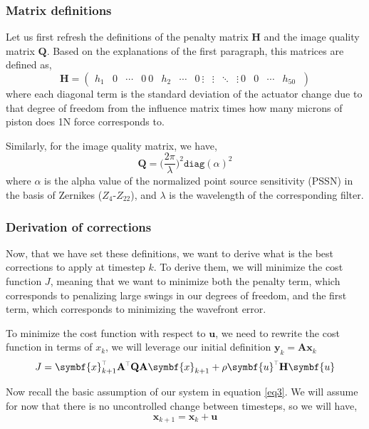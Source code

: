 \documentclass[SE,authoryear,toc]{lsstdoc}
\renewcommand{\v}[1]{\mathbf{#1}}
\newcommand{\tr}{\scalebox{0.6}{$\top$}}
\begin{document}
\subsubsection*{Matrix definitions}
Let us first refresh the definitions of the penalty matrix $\v{H}$ and the image quality matrix $\v{Q}$. Based on the explanations of the first paragraph, this matrices are defined as, 
\begin{equation}
    \v{H} = \left(
  \begin{array}{cccc}
    h_1 &   0     & \cdots & 0 \
    0 &   h_2     & \cdots & 0 \
    \vdots &   \vdots    & \ddots & \vdots \
    0 &   0     & \cdots & h_{50}  \
  \end{array}
\right)
\end{equation}
where each diagonal term is the standard deviation of the actuator change due to that degree of freedom from the influence matrix times how many microns of piston does 1N force corresponds to.

Similarly, for the image quality matrix, we have,
\begin{equation}
    \v{Q} = \Big(\frac{2\pi}{\lambda}\Big) ^2 \texttt{diag}(\alpha)^2
\end{equation}
where $\alpha$ is the alpha value of the normalized point source sensitivity (PSSN) in the basis of Zernikes ($Z_4$-$Z_{22}$), and $\lambda$ is the wavelength of the corresponding filter.

\subsubsection*{Derivation of corrections}
Now, that we have set these definitions, we want to derive what is the best corrections to apply at timestep $k$. To derive them, we will minimize the cost function $J$, meaning that we want to minimize both the penalty term, which corresponds to penalizing large swings in our degrees of freedom, and the first term, which corresponds to minimizing the wavefront error.

To minimize the cost function with respect to $\symbf{u}$, we need to rewrite the cost function in terms of $x_k$, we will leverage our initial definition $\symbf{y}_k = \v{A} \symbf{x}_k$
\begin{equation}
     J = \symbf{x}_{k+1}^{\tr}\v{A}^{\tr}\v{Q}\v{A}\symbf{x}_{k+1} + \rho \symbf{u}^{\tr}\v{H}\symbf{u}
\end{equation}

Now recall the basic assumption of our system in equation \ref{eq3}. We will assume for now that there is no uncontrolled change between timesteps, so we will have, 
\begin{equation}
    \symbf{x}_{k+1} = \symbf{x}_k + \symbf{u}
\end{equation}
\end{document}
